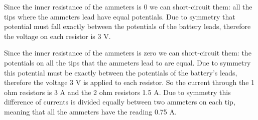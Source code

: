 {\ifEngHint
Since the inner resistance of the ammeters is 0 we can short-circuit them: all the tips where the ammeters lead have equal potentials. Due to symmetry that potential must fall exactly between the potentials of the battery leads, therefore the voltage on each resistor is 3 V.
\fi


\ifEngSolution
Since the inner resistance of the ammeters is zero we can short-circuit them: the potentials on all the tips that the ammeters lead to are equal. Due to symmetry this potential must be exactly between the potentials of the battery’s leads, therefore the voltage 3 V is applied to each resistor. So the current through the 1 ohm resistors is 3 A and the 2 ohm resistors 1.5 A. Due to symmetry this difference of currents is divided equally between two ammeters on each tip, meaning that all the ammeters have the reading 0.75 A.
\fi
}